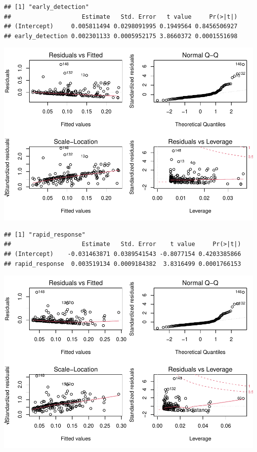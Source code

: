 \documentclass[
]{article}
\begin{document}
\begin{verbatim}
## [1] "early_detection"
##                    Estimate   Std. Error   t value     Pr(>|t|)
## (Intercept)     0.005811494 0.0298091995 0.1949564 0.8456506927
## early_detection 0.002301133 0.0005952175 3.8660372 0.0001551698
\end{verbatim}

\includegraphics{Basic-Regression_files/figure-latex/unnamed-chunk-5-2.pdf}

\begin{verbatim}
## [1] "rapid_response"
##                    Estimate   Std. Error    t value     Pr(>|t|)
## (Intercept)    -0.031463871 0.0389541543 -0.8077154 0.4203385866
## rapid_response  0.003519134 0.0009184382  3.8316499 0.0001766153
\end{verbatim}

\includegraphics{Basic-Regression_files/figure-latex/unnamed-chunk-5-3.pdf}
\end{document}
